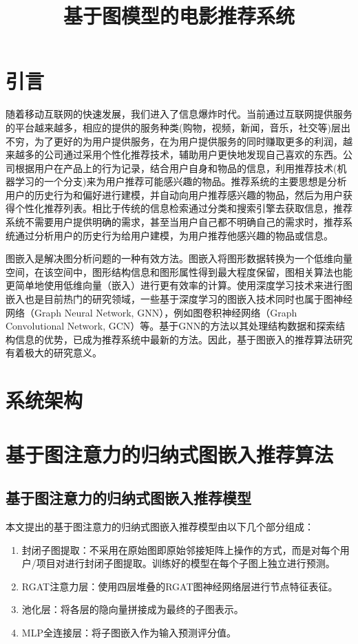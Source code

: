 \documentclass{ctexart}
\begin{document}
\title{基于图模型的电影推荐系统}
\section{引言}
随着移动互联网的快速发展，我们进入了信息爆炸时代。当前通过互联网提供服务的平台越来越多，相应的提供的服务种类(购物，视频，新闻，音乐，社交等)层出不穷，为了更好的为用户提供服务，在为用户提供服务的同时赚取更多的利润，越来越多的公司通过采用个性化推荐技术，辅助用户更快地发现自己喜欢的东西。公司根据用户在产品上的行为记录，结合用户自身和物品的信息，利用推荐技术(机器学习的一个分支)来为用户推荐可能感兴趣的物品。推荐系统的主要思想是分析用户的历史行为和偏好进行建模，并自动向用户推荐感兴趣的物品，然后为用户获得个性化推荐列表\cite{zheng_1}。相比于传统的信息检索通过分类和搜索引擎去获取信息，推荐系统不需要用户提供明确的需求，甚至当用户自己都不明确自己的需求时，推荐系统通过分析用户的历史行为给用户建模，为用户推荐他感兴趣的物品或信息。

图嵌入是解决图分析问题的一种有效方法。图嵌入将图形数据转换为一个低维向量空间，在该空间中，图形结构信息和图形属性得到最大程度保留，图相关算法也能更简单地使用低维向量（嵌入）进行更有效率的计算。使用深度学习技术来进行图嵌入也是目前热门的研究领域，一些基于深度学习的图嵌入技术同时也属于图神经网络（Graph Neural Network, GNN），例如图卷积神经网络（Graph Convolutional Network, GCN）等。基于GNN的方法以其处理结构数据和探索结构信息的优势，已成为推荐系统中最新的方法。因此，基于图嵌入的推荐算法研究有着极大的研究意义。

\section{系统架构}

\section{基于图注意力的归纳式图嵌入推荐算法}

\subsection{基于图注意力的归纳式图嵌入推荐模型}

本文提出的基于图注意力的归纳式图嵌入推荐模型由以下几个部分组成：
\begin{enumerate}
    \item 封闭子图提取：不采用在原始图即原始邻接矩阵上操作的方式，而是对每个用户/项目对进行封闭子图提取。训练好的模型在每个子图上独立进行预测。
    \item RGAT注意力层：使用四层堆叠的RGAT图神经网络层进行节点特征表征。
    \item 池化层：将各层的隐向量拼接成为最终的子图表示。
    \item MLP全连接层：将子图嵌入作为输入预测评分值。
\end{enumerate}
\end{document}
